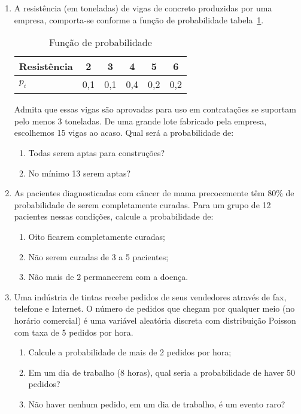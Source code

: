\documentclass[12pt, a4paper]{article}
\begin{document}
\begin{enumerate}
\item A resistência (em toneladas) de vigas de concreto produzidas por uma empresa, comporta-se conforme a função de probabilidade tabela~\ref{tab:res}.
\begin{table}[!htbp]
	\centering
	\caption{Função de probabilidade}
	\label{tab:res}
	\begin{tabular}{l|ccccc}
		\toprule[0.05cm]
		Resistência & 2 & 3 & 4 & 5 & 6 \\ \midrule[0.05cm]
		$p_i$ & 0,1 & 0,1 & 0,4 & 0,2 & 0,2 \\ \bottomrule[0.05cm]
	\end{tabular}
\end{table}
Admita que essas vigas são aprovadas para uso em contratações se suportam pelo menos 3 toneladas. De uma grande lote fabricado pela empresa, escolhemos 15 vigas ao acaso. Qual será a probabilidade de:
\begin{enumerate}
	\item Todas serem aptas para construções?
	\item No mínimo 13 serem aptas?
\end{enumerate}

\item As pacientes diagnosticadas com câncer de mama precocemente têm 80\% de probabilidade de serem completamente curadas. Para um grupo de 12 pacientes nessas condições, calcule a probabilidade de:
\begin{enumerate}
	\item Oito ficarem completamente curadas;
	\item Não serem curadas de 3 a 5 pacientes;
	\item Não mais de 2 permancerem com a doença.
\end{enumerate}

\item Uma indústria de tintas recebe pedidos de seus vendedores através de fax, telefone e Internet. O número de pedidos que chegam por qualquer meio (no horário comercial) é uma variável aleatória discreta com distribuição Poisson com taxa de 5 pedidos por hora.
\begin{enumerate}
	\item Calcule a probabilidade de mais de 2 pedidos por hora;
	\item Em um dia de trabalho (8 horas), qual seria a probabilidade de haver 50 pedidos?
	\item Não haver nenhum pedido, em um dia de trabalho, é um evento raro?
\end{enumerate}


\end{enumerate}
\end{document}
